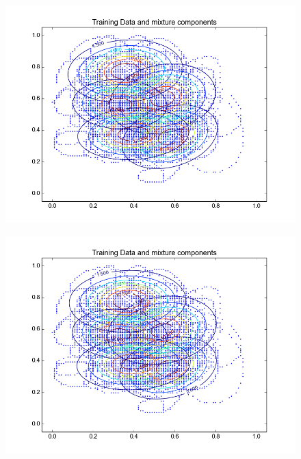 \documentclass[11pt,a4paper]{article}
\begin{document}
\begin{minipage}[b]{0.25\textwidth}
\begin{figure}[H]
  \centering
  \includegraphics[width=.8\linewidth]{Figures/contours_ai.test10.png}

  \label{fig:sfig1}
\end{figure}%
\end{minipage}
\begin{minipage}[b]{0.25\textwidth}
\begin{figure}[H]
  \centering
  \includegraphics[width=.8\linewidth]{Figures/contours_ai.test15.png}

  \label{fig:sfig1}
\end{figure}%
\end{minipage}
\end{document}
